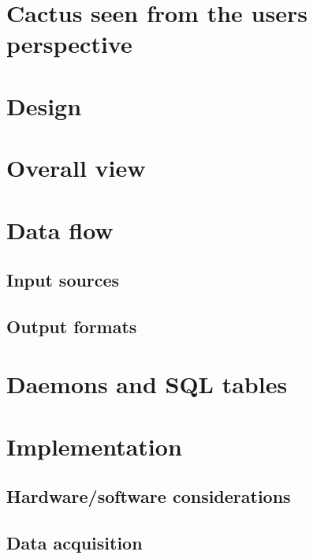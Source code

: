 \section{Cactus seen from the users perspective}
\label{sec:cactus-seen-from-the-users-perspective}

\section{Design}
\label{sec:cactus-design}


\section{Overall view}
\label{sec:cactus-overall-view}

\section{Data flow}
\label{sec:cactus-data-flow}

\subsection{Input sources}

\subsection{Output formats}

\section{Daemons and SQL tables}
\label{sec:cactus-daemons-and-sql-tables}

\section{Implementation}
\label{sec:cactus-implementation}

\subsection{Hardware/software considerations}


\subsection{Data acquisition}




